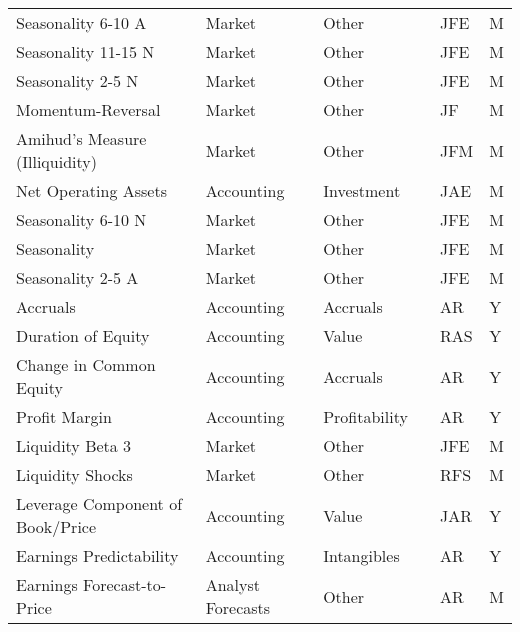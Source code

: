 \begin{tabular}{llllll}
Seasonality 6-10 A                         &             Market &          Other &       \cite{heston2008seasonality} &     JFE &         M \\
Seasonality 11-15 N                        &             Market &          Other &       \cite{heston2008seasonality} &     JFE &         M \\
Seasonality 2-5 N                          &             Market &          Other &       \cite{heston2008seasonality} &     JFE &         M \\
Momentum-Reversal                          &             Market &          Other &        \cite{jegadeesh1993returns} &      JF &         M \\
Amihud's Measure (Illiquidity)             &             Market &          Other &       \cite{amihud2002illiquidity} &     JFM &         M \\
Net Operating Assets                       &         Accounting &     Investment &    \cite{hirshleifer2004investors} &     JAE &         M \\
Seasonality 6-10 N                         &             Market &          Other &       \cite{heston2008seasonality} &     JFE &         M \\
Seasonality                                &             Market &          Other &       \cite{heston2008seasonality} &     JFE &         M \\
Seasonality 2-5 A                          &             Market &          Other &       \cite{heston2008seasonality} &     JFE &         M \\
Accruals                                   &         Accounting &       Accruals &             \cite{sloan1996create} &      AR &         Y \\
Duration of Equity                         &         Accounting &          Value &           \cite{dechow2004implied} &     RAS &         Y \\
Change in Common Equity                    &         Accounting &       Accruals &  \cite{richardson2006implications} &      AR &         Y \\
Profit Margin                              &         Accounting &  Profitability &              \cite{soliman2008use} &      AR &         Y \\
Liquidity Beta 3                           &             Market &          Other &            \cite{acharya2005asset} &     JFE &         M \\
Liquidity Shocks                           &             Market &          Other &           \cite{bali2013liquidity} &     RFS &         M \\
Leverage Component of Book/Price           &         Accounting &          Value &              \cite{penman2007book} &     JAR &         Y \\
Earnings Predictability                    &         Accounting &    Intangibles &            \cite{francis2004costs} &      AR &         Y \\
Earnings Forecast-to-Price                 &  Analyst Forecasts &          Other &           \cite{elgers2001delayed} &      AR &         M \\
\bottomrule
\end{tabular}

